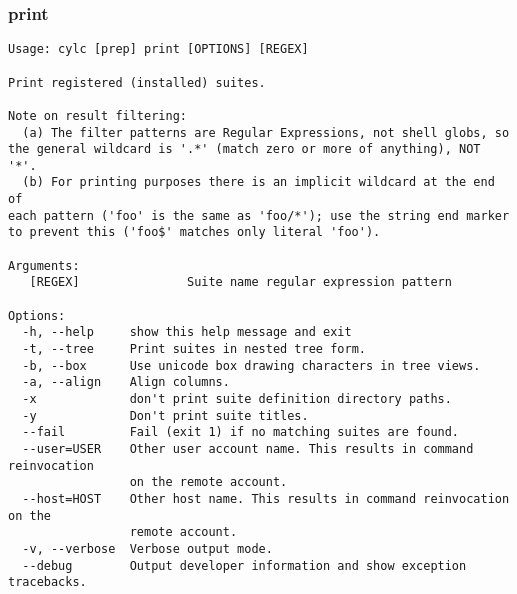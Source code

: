 \subsubsection{print}
\label{print}
\begin{lstlisting}
Usage: cylc [prep] print [OPTIONS] [REGEX]

Print registered (installed) suites.

Note on result filtering:
  (a) The filter patterns are Regular Expressions, not shell globs, so
the general wildcard is '.*' (match zero or more of anything), NOT '*'.
  (b) For printing purposes there is an implicit wildcard at the end of
each pattern ('foo' is the same as 'foo/*'); use the string end marker
to prevent this ('foo$' matches only literal 'foo').

Arguments:
   [REGEX]               Suite name regular expression pattern

Options:
  -h, --help     show this help message and exit
  -t, --tree     Print suites in nested tree form.
  -b, --box      Use unicode box drawing characters in tree views.
  -a, --align    Align columns.
  -x             don't print suite definition directory paths.
  -y             Don't print suite titles.
  --fail         Fail (exit 1) if no matching suites are found.
  --user=USER    Other user account name. This results in command reinvocation
                 on the remote account.
  --host=HOST    Other host name. This results in command reinvocation on the
                 remote account.
  -v, --verbose  Verbose output mode.
  --debug        Output developer information and show exception tracebacks.
\end{lstlisting}
